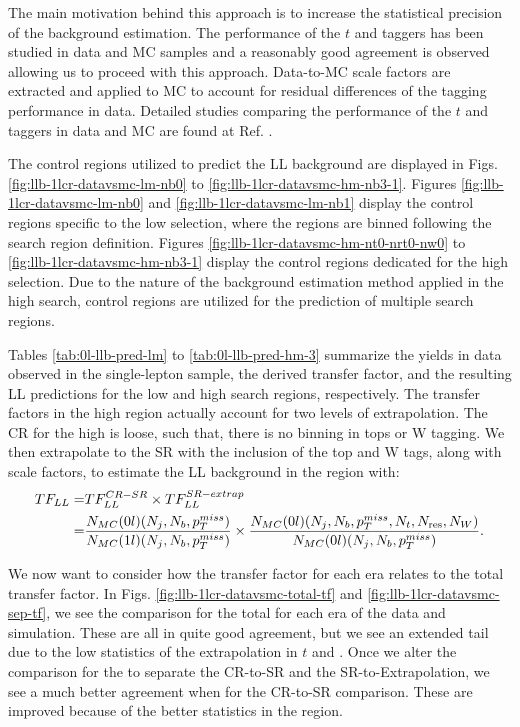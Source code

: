 The main motivation behind this approach is to increase the statistical precision of the background estimation. The performance of the $t$ and \W{} taggers has been studied in data and MC samples and a reasonably good agreement is observed allowing us to proceed with this approach. Data-to-MC scale factors are extracted and applied to MC to account for residual differences of the tagging performance in data. Detailed studies comparing the performance of the $t$ and \W{} taggers in data and MC are found at Ref. \cite{cms_collaboration_search_2016}.

The control regions utilized to predict the LL background are displayed in Figs. \ref{fig:llb-1lcr-datavsmc-lm-nb0} to \ref{fig:llb-1lcr-datavsmc-hm-nb3-1}. Figures \ref{fig:llb-1lcr-datavsmc-lm-nb0} and \ref{fig:llb-1lcr-datavsmc-lm-nb1} display the control regions specific to the low \dm{} selection, where the regions are binned following the search region definition. Figures \ref{fig:llb-1lcr-datavsmc-hm-nt0-nrt0-nw0} to \ref{fig:llb-1lcr-datavsmc-hm-nb3-1} display the control regions dedicated for the high \dm{} selection. Due to the nature of the background estimation method applied in the high \dm{} search, control regions are utilized for the prediction of multiple search regions. 

Tables \ref{tab:0l-llb-pred-lm} to \ref{tab:0l-llb-pred-hm-3} summarize the yields in data observed in the single-lepton sample, the derived transfer factor, and the resulting LL predictions for the low \dm{} and high \dm{} search regions, respectively. The transfer factors in the high \dm{} region actually account for two levels of extrapolation. The CR for the high \dm{} is loose, such that, there is no binning in tops or W tagging. We then extrapolate to the SR with the inclusion of the top and W tags, along with scale factors, to estimate the LL background in the region with:
\begin{equation}\label{TFExtrapolation}
\begin{split}
TF_{LL}=& TF_{LL}^{CR-SR}\times TF_{LL}^{SR-extrap} \\
=& \frac{N_{MC}(0l)(N_{j},N_{b},p_{T}^{miss})}{N_{MC}(1l)(N_{j},N_{b},p_{T}^{miss})}\times\frac{N_{MC}(0l)(N_{j},N_{b},p_{T}^{miss},N_{t},N_{\text{res}},N_{W})}{N_{MC}(0l)(N_{j},N_{b},p_{T}^{miss})}.
\end{split}
\end{equation}

We now want to consider how the transfer factor for each era relates to the total transfer factor. In Figs. \ref{fig:llb-1lcr-datavsmc-total-tf} and \ref{fig:llb-1lcr-datavsmc-sep-tf}, we see the comparison for the total \tfll{} for each era of the data and simulation. These are all in quite good agreement, but we see an extended tail due to the low statistics of the extrapolation in $t$ and \W. Once we alter the comparison for the \tfll{} to separate the CR-to-SR and the SR-to-Extrapolation, we see a much better agreement when for the CR-to-SR comparison. These are improved because of the better statistics in the region. 






